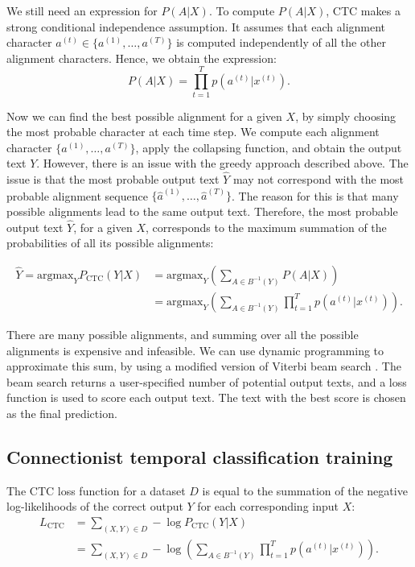 We still need an expression for $P(A|X)$.
To compute $P(A|X)$, CTC makes a strong conditional independence assumption. 
It assumes that each alignment character $a^{(t)} \in \{a^{(1)}, \dots, a^{(T)}\}$ 
is computed independently of all the other alignment characters.
Hence, we obtain the expression:
\begin{equation}
    P(A|X) = \prod\limits_{t=1}^{T} p(a^{(t)} | x^{(t)}).
\end{equation}

Now we can find the best possible alignment for a given $X$, by simply choosing the most probable character at each time step.
We compute each alignment character $\{a^{(1)}, \dots, a^{(T)}\}$, apply the collapsing function, and obtain the output text $Y$.
However, there is an issue with the greedy approach described above. 
The issue is that the most probable output text $\hat{Y}$ may not correspond
with the most probable alignment sequence $\{\hat{a}^{(1)}, \dots, \hat{a}^{(T)}\}$.
The reason for this is that many possible alignments lead to the same
output text. Therefore, the most probable output text $\hat{Y}$, for a given $X$, corresponds to the maximum summation of the probabilities of all its
possible alignments:

\begin{align}
    \hat{Y} = \text{argmax}_Y P_{\text{CTC}}(Y|X) &= \text{argmax}_Y \left(\sum\limits_{A \in B^{-1}(Y)} P(A|X)\right) \\
                                                               &= \text{argmax}_Y \left(\sum\limits_{A \in B^{-1}(Y)} \prod\limits_{t=1}^{T} p(a^{(t)} | x^{(t)})\right).
\end{align}

There are many possible alignments, and summing over all the possible alignments is expensive and infeasible.
We can use dynamic programming to approximate this sum, by using a modified version of Viterbi beam search \cite{hannun2017sequence}. 
The beam search returns a user-specified number of potential output texts, 
and a loss function is used to score each output text.
The text with the best score is chosen as the final prediction.

\subsection{Connectionist temporal classification training}
The CTC loss function for a dataset $D$ is equal to the summation of the negative log-likelihoods 
of the correct output $Y$ for each corresponding input $X$:
\begin{align}
    L_{\text{CTC}} &= \sum_{(X,Y) \in D} -\log P_{\text{CTC}}(Y|X) \\
                    &= \sum_{(X,Y) \in D} -\log \left( \sum_{A \in B^{-1}(Y)} \prod_{t=1}^{T} p(a^{(t)} | x^{(t)}) \right).
\end{align}

